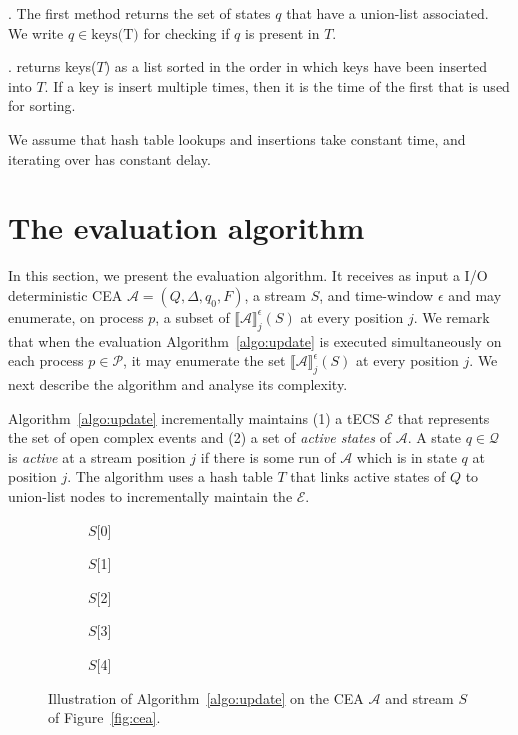 . The first method returns the set of states $q$ that have a union-list associated. We write $q \in \text{keys(T)}$ for checking if $q$ is present in $T$.

. returns keys($T$) as a list sorted in the order in which keys have been inserted into $T$. If a key is insert multiple times, then it is the time of the first that is used for sorting.

We assume that hash table lookups and insertions take constant time, and iterating over has constant delay.

\section{The evaluation algorithm}\label{sec:evaluation}

In this section, we present the evaluation algorithm. It receives as input a I/O deterministic CEA ${\mathcal{A} = (Q, \Delta, q_{0}, F)}$, a stream $S$, and time-window $\epsilon$ and may enumerate, on process $p$, a subset of ${\llbracket \mathcal{A} \rrbracket}^{\epsilon}_{j}(S)$ at every position $j$. We remark that when the evaluation Algorithm~\ref{algo:update} is executed simultaneously on each process $p \in \mathcal{P}$, it may enumerate the set ${\llbracket \mathcal{A} \rrbracket}^{\epsilon}_{j}(S)$ at every position $j$. We next describe the algorithm and analyse its complexity.

Algorithm~\ref{algo:update} incrementally maintains (1) a tECS $\mathcal{E}$ that represents the set of open complex events and (2) a set of \emph{active states} of $\mathcal{A}$. A state $q \in \mathcal{Q}$ is \emph{active} at a stream position $j$ if there is some run of $\mathcal{A}$ which is in state $q$ at position $j$. The algorithm uses a hash table $T$ that links active states of $Q$ to union-list nodes to incrementally maintain the $\mathcal{E}$.

\begin{figure}[H]
  \centering
  \begin{subfigure}[b]{0.1\linewidth}
    \caption*{$S[$0$]$}
  \end{subfigure}
  \begin{subfigure}[b]{0.1\linewidth}
    \caption*{$S[$1$]$}
  \end{subfigure}
  \begin{subfigure}[b]{0.24\linewidth}
    \caption*{$S[$2$]$}
  \end{subfigure}
  \begin{subfigure}[b]{0.24\linewidth}
    \caption*{$S[$3$]$}
  \end{subfigure}
  \begin{subfigure}[b]{0.28\linewidth}
    \caption*{$S[$4$]$}
  \end{subfigure}
  \caption{Illustration of Algorithm~\ref{algo:update} on the CEA $\mathcal{A}$ and stream $S$ of Figure~\ref{fig:cea}.}
  \label{fig:tecs:update}
\end{figure}

